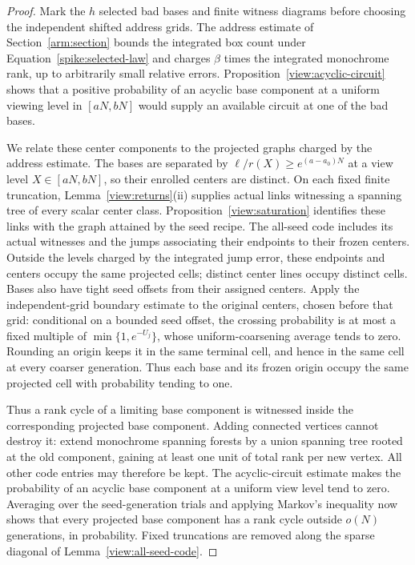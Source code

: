 \begin{proof}
Mark the $h$ selected bad bases and finite witness
diagrams before choosing the independent shifted address grids.
The address estimate of Section~\ref{arm:section} bounds the integrated
box count under Equation~\eqref{spike:selected-law} and charges
$\beta$ times the integrated monochrome rank, up to arbitrarily small
relative errors.  Proposition~\ref{view:acyclic-circuit} shows that a
positive probability of an acyclic base component at a uniform viewing
level in $[aN,bN]$ would supply an available circuit at one of the bad
bases.

We relate these center components to the projected graphs charged by
the address estimate.  The bases are separated by
$\ell/r(X)\ge e^{(a-a_0)N}$ at a view level $X\in[aN,bN]$, so their
enrolled centers are distinct.  On each fixed finite truncation,
Lemma~\ref{view:returns}(ii) supplies actual links witnessing a
spanning tree of every scalar center class.
Proposition~\ref{view:saturation} identifies these links with the
graph attained by the seed recipe.  The all-seed code includes its
actual witnesses and the jumps associating their endpoints to their
frozen centers.  Outside the levels charged by the integrated jump
error, these endpoints and centers occupy the same projected cells;
distinct center lines occupy distinct cells.  Bases also have tight
seed offsets from their assigned centers.  Apply the independent-grid
boundary estimate to the original centers, chosen before that grid:
conditional on a bounded seed offset, the crossing probability is at
most a fixed multiple of $\min\{1,e^{-U_j}\}$, whose uniform-coarsening
average tends to zero.  Rounding an origin keeps it in the same
terminal cell, and hence in the same cell at every coarser generation.
Thus each base and its frozen origin occupy the same projected cell
with probability tending to one.

Thus a rank cycle of a limiting base component is witnessed inside
the corresponding projected base component.  Adding connected vertices
cannot destroy it: extend monochrome spanning forests by a union
spanning tree rooted at the old component, gaining at least one unit
of total rank per new vertex.  All other code entries may therefore
be kept.  The acyclic-circuit estimate makes the probability of an
acyclic base component at a uniform view level tend to zero.  Averaging
over the seed-generation trials and applying Markov's inequality now
shows that every projected base component has a rank cycle outside
$o(N)$ generations, in probability.  Fixed truncations are removed
along the sparse diagonal of Lemma~\ref{view:all-seed-code}.


\end{proof}
